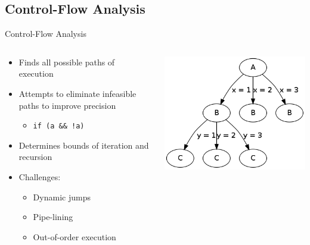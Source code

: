 \documentclass{beamer}
\begin{document}
\subsection{Control-Flow Analysis}
\begin{frame}{Control-Flow Analysis}
  \begin{columns}
    \begin{column}{0.63\textwidth}
      \begin{itemize}
        \item Finds all possible paths of execution
        \item Attempts to eliminate infeasible paths to improve precision
          \begin{itemize}
            \item \texttt{if (a \&\& !a)}
          \end{itemize}
        \item Determines bounds of iteration and recursion
        \item<2-> Challenges:
          \begin{itemize}
            \item Dynamic jumps
            \item Pipe-lining
            \item Out-of-order execution
          \end{itemize}
      \end{itemize}
    \end{column}
    \begin{column}{0.37\textwidth}
      \includegraphics[scale=0.35]{controlflowanalysis.png}
    \end{column}
  \end{columns}
\end{frame}
\end{document}
